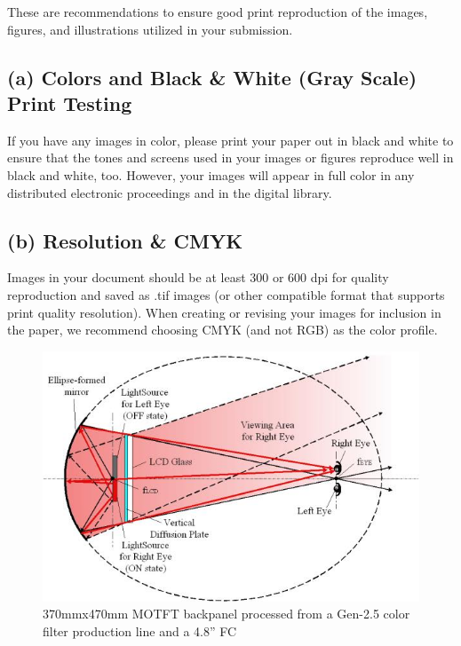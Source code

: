 \documentclass[9pt]{extarticle}
\begin{document}
\begin{multicols}{2}
These are recommendations to ensure good print reproduction of the images, figures, and illustrations utilized in your submission.

\subsection{(a) Colors and Black \& White (Gray Scale) Print Testing}

If you have any images in color, please print your paper out in black and white to ensure that the tones and screens used in your images or figures reproduce well in black and white, too.
However, your images will appear in full color in any distributed electronic proceedings and in the digital library. 

\subsection{(b) Resolution \& CMYK}
Images in your document should be at least 300 or 600 dpi for quality reproduction and saved as .tif images (or other compatible format that supports print quality resolution).
When creating or revising your images for inclusion in the paper, we recommend choosing CMYK (and not RGB) as the color profile. 

\begin{figure}[H]
    \centering
    \includegraphics[width=\linewidth]{ellipse}
    \caption{370mmx470mm MOTFT backpanel processed from a Gen-2.5 color filter production line and a 4.8” FC}
    \label{fig:ellipse}
\end{figure}

\end{multicols}
\end{document}
